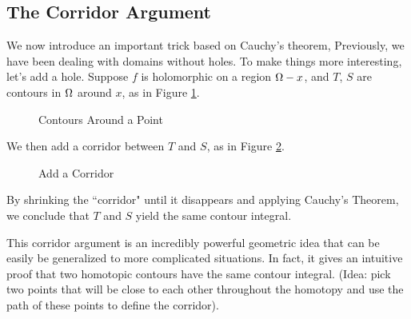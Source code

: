 \subsection{The Corridor Argument}
We now introduce an important trick based on Cauchy's theorem, Previously, we have been dealing with domains without holes. To make things more
interesting, let's add a hole. Suppose $f$ is holomorphic on a region $\Omega - x$,
and $T$, $S$ are contours in $\Omega$ around $x$, as in Figure \ref{fig:Contour-around-a-Point}.
\begin{figure}[ht]
    \centering
    \caption{Contours Around a Point}
    \label{fig:Contour-around-a-Point}
\end{figure}
We then add a corridor between $T$ and $S$, as in Figure \ref{fig:Add-a-Keyhole}.
\begin{figure}[ht]
    \centering
    \caption{Add a Corridor}
    \label{fig:Add-a-Keyhole}
\end{figure}
By shrinking the ``corridor" until it disappears 
and applying Cauchy's Theorem, we conclude that $T$ and $S$ yield the same contour integral.

This corridor argument is an incredibly powerful geometric idea that can be easily be generalized to more complicated situations. In fact, it gives an intuitive proof that two homotopic contours have the same contour integral. (Idea: pick two points that will be close to each other throughout the homotopy and use the path of these points to define the corridor).
